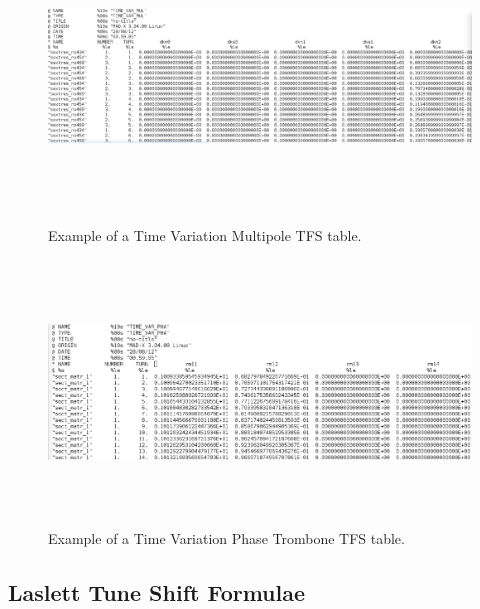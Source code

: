 \newpage
\begin{figure}[H]
\centering
\begin{minipage}[b]{0.45\linewidth}
  \includegraphics[height=7cm,angle=-90]{eps/cut_out_time_var_mul}
\caption{Example of a Time Variation Multipole TFS table.}
\label{TIME_VAR_MUL}
\end{minipage}
\quad
\begin{minipage}[b]{0.45\linewidth}
\includegraphics[height=7cm,angle=-90]{eps/cut_out_time_var_pha}
\caption{Example of a Time Variation Phase Trombone TFS table.}
\label{TIME_VAR_PHA}
\end{minipage}
\end{figure}

\subsection{Laslett Tune Shift Formulae}\label{SEC:LASLETT}

